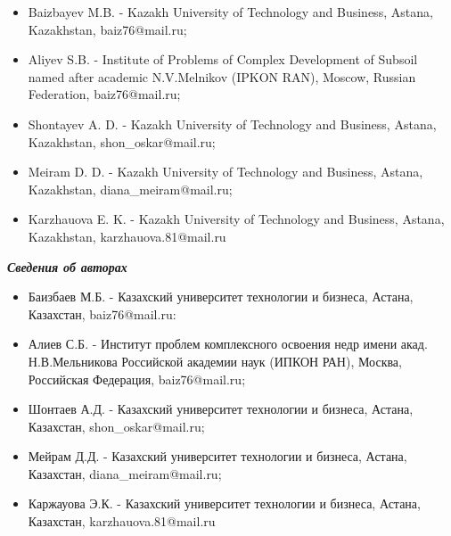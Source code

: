 \begin{itemize}
\item
Baizbayev M.B. - Kazakh University of Technology and Business, Astana,
Kazakhstan, baiz76@mail.ru;

\item
Aliyev S.B. - Institute of Problems of Complex Development of Subsoil
named after academic N.V.Melnikov (IPKON RAN), Moscow, Russian
Federation, baiz76@mail.ru;

\item
Shontayev A. D. - Kazakh University of Technology and Business, Astana,
Kazakhstan,
shon\_oskar@mail.ru;

\item
Meiram D. D. - Kazakh University of Technology and Business, Astana,
Kazakhstan,
diana\_meiram@mail.ru;

\item
Karzhauova E. K. - Kazakh University of Technology and Business, Astana,
Kazakhstan,
karzhauova.81@mail.ru
\end{itemize}

\begin{center}
\emph{{\bfseries Сведения об авторах}}
\end{center}

\begin{itemize}
\item
Баизбаев М.Б. - Казахский университет технологии и бизнеса, Астана,
Казахстан, baiz76@mail.ru:

\item
Алиев С.Б. - Институт проблем комплексного освоения недр имени акад.
Н.В.Мельникова Российской академии наук (ИПКОН РАН), Москва, Российская
Федерация, baiz76@mail.ru;

\item
Шонтаев А.Д. - Казахский университет технологии и бизнеса, Астана,
Казахстан,
shon\_oskar@mail.ru;

\item
Мейрам Д.Д. - Казахский университет технологии и бизнеса, Астана,
Казахстан,
diana\_meiram@mail.ru;

\item
Каржауова Э.К. - Казахский университет технологии и бизнеса, Астана,
Казахстан,
karzhauova.81@mail.ru
\end{itemize}
